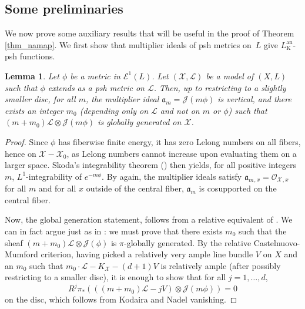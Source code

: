 \documentclass[JEP,XML,SOM,Unicode,NoEqCountersInSection,published]{cedram}
\newtheorem{lemma}[theorem]{Lemma}
\theoremstyle{definition}
\newcommand\cE{\mathcal{E}}
\newcommand\cJ{\mathcal{J}}
\newcommand\cL{\mathcal{L}}
\newcommand\cO{\mathcal{O}}
\newcommand\cX{\mathcal{X}}
\newcommand\K{\mathrm{K}}
\newcommand\an{^{\mathrm{an}}}
\newcommand\ideal{\mathfrak{a}}
\begin{document}
\subsection{Some preliminaries}\label{subsect_23}

We now prove some auxiliary results that will be useful in the proof of Theorem \ref{thm_namap}. We first show that multiplier ideals of psh metrics on~$L$ give $L_\K\an$-psh functions.

\begin{lemma}\label{lem_multidealisvertical}
Let $\phi$ be a metric in $\cE^1(L)$. Let $(\cX,\cL)$ be a model of $(X,L)$ such that $\phi$ extends as a psh metric on $\cL$. Then, up to restricting to a slightly smaller disc, for all $m$, the multiplier ideal $\ideal_m=\cJ(m\phi)$ is vertical, and there exists an integer $m_0$ (depending only on $\cL$ and not on $m$ or $\phi$) such that $(m+m_0)\cL\otimes \cJ(m\phi)$ is globally generated on $\cX$.
\end{lemma}
\begin{proof}
Since $\phi$ has fiberwise finite energy, it has zero Lelong numbers on all fibers, hence on $\cX-\cX_0$, as Lelong numbers cannot increase upon evaluating them on a larger space. Skoda's integrability theorem (\cite[Lem.\,5.6(a)]{demanalytic}) then yields, for all positive integers $m$, $L^1$-integrability of $e^{-m\phi}$. By \cite[Lem.\,5.6(a)]{demanalytic} again, the multiplier ideals satisfy $\ideal_m{}_{,x}=\cO_\cX{}_{,x}$ for all $m$ and for all $x$ outside of the central fiber, \ie $\ideal_m$ is cosupported on the central fiber.

Now, the global generation statement, follows from a relative equivalent of \cite[Prop.\,6.27]{demanalytic}. We can in fact argue just as in \cite[Lem.\,5.6]{bbj}: we must prove that there exists $m_0$ such that the sheaf $(m+m_0)\cL\otimes \cJ(\phi)$ is $\pi$-globally generated. By the relative Castelnuovo-Mumford criterion, having picked a relatively very ample line bundle $V$ on $X$ and an $m_0$ such that $m_0\cdot \cL - K_\cX - (d+1)V$ is relatively ample (after possibly restricting to a smaller disc), it is enough to show that for all $j=1,\dots,d$,
\[
R^j\pi_*(((m+m_0)\cL-jV)\otimes \cJ(m\phi))=0
\]
on the disc, which follows from Kodaira and Nadel vanishing.
\end{proof}
\end{document}
